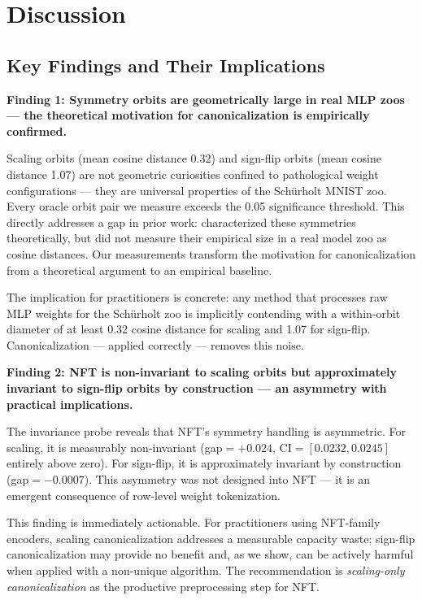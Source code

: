 \section{Discussion}
\label{sec:discussion}

\subsection{Key Findings and Their Implications}

\textbf{Finding 1: Symmetry orbits are geometrically large in real MLP zoos --- the theoretical motivation for canonicalization is empirically confirmed.}

Scaling orbits (mean cosine distance 0.32) and sign-flip orbits (mean cosine distance 1.07) are not geometric curiosities confined to pathological weight configurations --- they are universal properties of the Schürholt MNIST zoo. Every oracle orbit pair we measure exceeds the 0.05 significance threshold. This directly addresses a gap in prior work: \citet{Navon2023EquivariantArchitectures} characterized these symmetries theoretically, but did not measure their empirical size in a real model zoo as cosine distances. Our measurements transform the motivation for canonicalization from a theoretical argument to an empirical baseline.

The implication for practitioners is concrete: any method that processes raw MLP weights for the Schürholt zoo is implicitly contending with a within-orbit diameter of at least 0.32 cosine distance for scaling and 1.07 for sign-flip. Canonicalization --- applied correctly --- removes this noise.

\textbf{Finding 2: NFT is non-invariant to scaling orbits but approximately invariant to sign-flip orbits by construction --- an asymmetry with practical implications.}

The invariance probe reveals that NFT's symmetry handling is asymmetric. For scaling, it is measurably non-invariant (gap$=+0.024$, CI$=[0.0232, 0.0245]$ entirely above zero). For sign-flip, it is approximately invariant by construction (gap$=-0.0007$). This asymmetry was not designed into NFT --- it is an emergent consequence of row-level weight tokenization.

This finding is immediately actionable. For practitioners using NFT-family encoders, scaling canonicalization addresses a measurable capacity waste; sign-flip canonicalization may provide no benefit and, as we show, can be actively harmful when applied with a non-unique algorithm. The recommendation is \textit{scaling-only canonicalization} as the productive preprocessing step for NFT.

